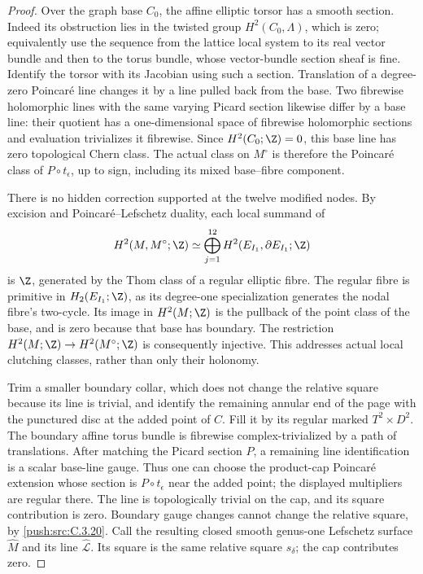 \begin{proof}
Over the graph base $C_0$, the affine elliptic torsor has a
smooth section. Indeed its obstruction lies in the twisted
group $H^2(C_0,\Lambda)$, which is zero; equivalently use the
sequence from the lattice local system to its real vector
bundle and then to the torus bundle, whose vector-bundle
section sheaf is fine. Identify the torsor with its Jacobian
using such a section. Translation of a degree-zero Poincar\'e
line changes it by a line pulled back from the base. Two
fibrewise holomorphic lines with the same varying Picard
section likewise differ by a base line: their quotient has a
one-dimensional space of fibrewise holomorphic sections and
evaluation trivializes it fibrewise. Since $H^2(C_0;\Z)=0$,
this base line has zero topological Chern class. The actual
class on $M^\circ$ is therefore the Poincar\'e class of
$P\circ t_\epsilon$, up to sign, including its mixed
base--fibre component.

There is no hidden correction supported at the twelve modified
nodes. By excision and Poincar\'e--Lefschetz duality, each
local summand of
\[
 H^2(M,M^\circ;\Z)
 \simeq\bigoplus_{j=1}^{12}H^2(E_{I_1},\partial E_{I_1};\Z)
\]
is $\Z$, generated by the Thom class of a regular elliptic
fibre. The regular fibre is primitive in $H_2(E_{I_1};\Z)$,
as its degree-one specialization generates the nodal fibre's
two-cycle. Its image in $H^2(M;\Z)$ is the pullback of the
point class of the base, and is zero because that base has
boundary. The restriction $H^2(M;\Z)\to H^2(M^\circ;\Z)$
is consequently injective. This addresses actual local
clutching classes, rather than only their holonomy.

Trim a smaller boundary collar, which does not change the
relative square because its line is trivial, and identify the
remaining annular end of the page with the punctured disc at
the added point of $C$. Fill it by its regular marked
$T^2\times D^2$. The boundary affine torus bundle is
fibrewise complex-trivialized by a path of translations.
After matching the Picard section $P$, a remaining line
identification is a scalar base-line gauge. Thus one can choose
the product-cap Poincar\'e extension whose section is
$P\circ t_\epsilon$ near the added point; the displayed
multipliers are regular there. The line is topologically
trivial on the cap, and its square contribution is zero.
Boundary gauge changes cannot change the relative square, by
\ref{push:src:C.3.20}. Call the resulting
closed smooth genus-one Lefschetz surface $\widehat M$ and its
line $\widehat{\mathcal L}$. Its square is the same relative
square $s_\delta$; the cap contributes zero.


\end{proof}
